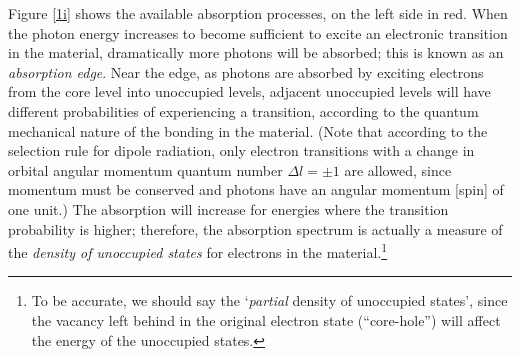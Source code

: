 Figure \ref{1i} shows the available absorption processes, on the left side in red.  When the photon energy increases to become sufficient to excite an electronic transition in the material, dramatically more photons will be absorbed; this is known as an \emph{absorption edge}.  Near the edge, as photons are absorbed by exciting electrons from the core level into unoccupied levels, adjacent unoccupied  levels will have different probabilities of experiencing a transition, according to the quantum mechanical nature of the bonding in the material.  (Note that according to the selection rule for dipole radiation, only electron transitions with a change in orbital angular momentum quantum number $\Delta l = \pm 1$ are allowed, since momentum must be conserved and photons have an angular momentum [spin] of one unit.)  The absorption will increase for energies where the transition probability is higher; therefore, the absorption spectrum is actually a measure of the \emph{density of unoccupied states} for electrons in the material.\footnote{To be accurate, we should say the `\emph{partial} density of unoccupied states', since the vacancy left behind in the original electron state (``core-hole'') will affect the energy of the unoccupied states.}

